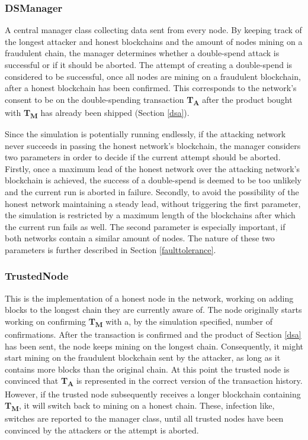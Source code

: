 \documentclass[a4paper,12pt,twoside]{report}
\begin{document}
\subsubsection{DSManager} \label{manager}
A central manager class collecting data sent from every node. By keeping track of the longest attacker and honest blockchains and the amount of nodes mining on a fraudulent chain, the manager determines whether a double-spend attack is successful or if it should be aborted. The attempt of creating a double-spend is considered to be successful, once all nodes are mining on a fraudulent blockchain, after a honest blockchain has been confirmed. This corresponds to the network's consent to be on the double-spending transaction \textbf{T\textsubscript{A}} after the product bought with \textbf{T\textsubscript{M}} has already been shipped (Section \ref{dsa}). 

Since the simulation is potentially running endlessly, if the attacking network never succeeds in passing the honest network's blockchain, the manager considers two parameters in order to decide if the current attempt should be aborted. Firstly, once a maximum lead of the honest network over the attacking network's blockchain is achieved, the success of a double-spend is deemed to be too unlikely and the current run is aborted in failure. Secondly, to avoid the possibility of the honest network maintaining a steady lead, without triggering the first parameter, the simulation is restricted by a maximum length of the blockchains after which the current run fails as well.  The second parameter is especially important, if both networks contain a similar amount of nodes. The nature of these two parameters is further described in Section \ref{faulttolerance}.
\subsubsection{TrustedNode}
This is the implementation of a honest node in the network, working on adding blocks to the longest chain they are currently aware of. The node originally starts working on confirming \textbf{T\textsubscript{M}} with a, by the simulation specified, number of confirmations. After the transaction is confirmed and the product of Section \ref{dsa} has been sent, the node keeps mining on the longest chain. Consequently, it might start mining on the fraudulent blockchain sent by the attacker, as long as it contains more blocks than the original chain. At this point the trusted node is convinced that \textbf{T\textsubscript{A}} is represented in the correct version of the transaction history. However, if the trusted node subsequently receives a longer blockchain containing \textbf{T\textsubscript{M}}, it will switch back to mining on a honest chain. These, infection like, switches are reported to the manager class, until all trusted nodes have been convinced by the attackers or the attempt is aborted.
\end{document}
